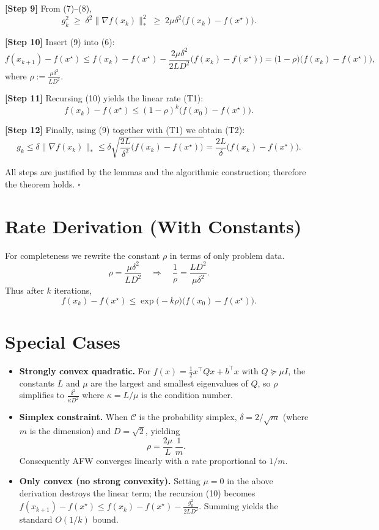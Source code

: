 \documentclass{article}
\begin{document}
\noindent\textbf{[Step 9]}  From (7)–(8),
\[
g_k^{2}\;\ge\;\delta^{2}\|\nabla f(x_k)\|_{*}^{2}
\;\ge\;2\mu\delta^{2}\bigl(f(x_k)-f(x^{\star})\bigr).
\tag{9}
\]

\noindent\textbf{[Step 10]}  Insert (9) into (6):
\[
f(x_{k+1})-f(x^{\star})
\le f(x_k)-f(x^{\star})-\frac{2\mu\delta^{2}}{2L D^{2}}
\bigl(f(x_k)-f(x^{\star})\bigr)
= \bigl(1-\rho\bigr)\bigl(f(x_k)-f(x^{\star})\bigr),
\tag{10}
\]
where $\displaystyle\rho:=\frac{\mu\delta^{2}}{L D^{2}}$.

\noindent\textbf{[Step 11]}  Recursing (10) yields the linear rate (T1):
\[
f(x_k)-f(x^{\star})\le (1-\rho)^{k}\bigl(f(x_0)-f(x^{\star})\bigr).
\]

\noindent\textbf{[Step 12]}  Finally, using (9) together with (T1) we obtain (T2):
\[
g_k\le\delta\|\nabla f(x_k)\|_{*}
\le\delta\sqrt{\frac{2L}{\delta^{2}}\bigl(f(x_k)-f(x^{\star})\bigr)}
= \frac{2L}{\delta}\bigl(f(x_k)-f(x^{\star})\bigr).
\]

All steps are justified by the lemmas and the algorithmic construction; therefore the theorem holds. \hfill $\square$

\section*{Rate Derivation (With Constants)}
For completeness we rewrite the constant $\rho$ in terms of only problem data.
\[
\rho=\frac{\mu\delta^{2}}{L D^{2}}
\quad\Longrightarrow\quad
\frac{1}{\rho}= \frac{L D^{2}}{\mu\delta^{2}}.
\]
Thus after $k$ iterations,
\[
f(x_k)-f(x^{\star})\le
\exp\!\bigl(-k\rho\bigr)\bigl(f(x_0)-f(x^{\star})\bigr).
\]

\section*{Special Cases}
\begin{itemize}
\item \textbf{Strongly convex quadratic.} For $f(x)=\frac12 x^{\top}Qx+b^{\top}x$ with $Q\succeq\mu I$,
the constants $L$ and $\mu$ are the largest and smallest eigenvalues of $Q$,
so $\rho$ simplifies to $\frac{\delta^{2}}{\kappa D^{2}}$ where $\kappa=L/\mu$ is the condition number.
\item \textbf{Simplex constraint.} When $\mathcal C$ is the probability simplex,
$\delta=2/\sqrt{m}$ (where $m$ is the dimension) and $D=\sqrt{2}$, yielding
\[
\rho=\frac{2\mu}{L}\,\frac{1}{m}.
\]
Consequently AFW converges linearly with a rate proportional to $1/m$.
\item \textbf{Only convex (no strong convexity).} Setting $\mu=0$ in the above
derivation destroys the linear term; the recursion (10) becomes
$f(x_{k+1})-f(x^{\star})\le f(x_k)-f(x^{\star})-\frac{g_k^{2}}{2LD^{2}}$.
Summing yields the standard $O(1/k)$ bound.
\end{itemize}
\end{document}
